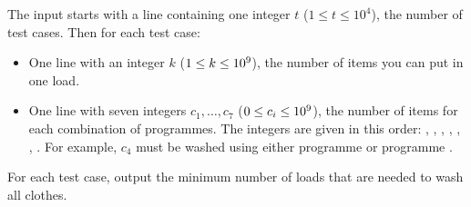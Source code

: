 \begin{Input}
    The input starts with a line containing one integer $t$ ($1 \leq t \leq 10^4$), the number of test cases.
    Then for each test case: 
    \begin{itemize}
        \item One line with an integer $k$ ($1\leq k\leq 10^9$), the number of items you can put in one load.
        \item One line with seven integers $c_1, \ldots, c_7$ ($0 \leq c_i \leq 10^9$), the number of items for each combination of programmes. 
        The integers are given in this order: \wa, \wb, \wc, \wa\wb, \wb\wc, \wa\wc, \wa\wb\wc. 
        For example, $c_4$ must be washed using either programme \wa{} or programme \wb.  
    \end{itemize}
\end{Input}

\begin{Output}
    For each test case, output the minimum number of loads that are needed to wash all clothes. 
\end{Output}
